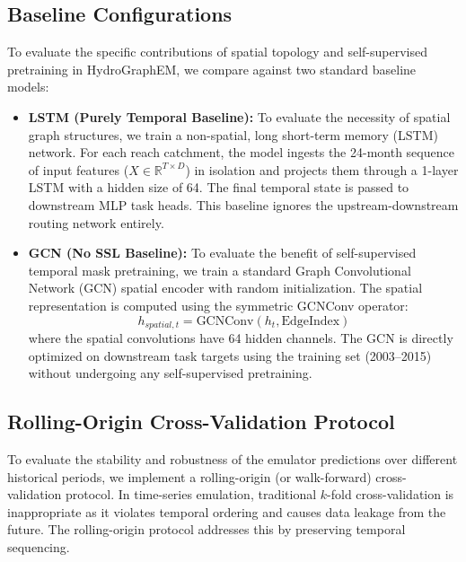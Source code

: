 \documentclass[preprint,12pt]{elsarticle}
\begin{document}
\subsection{Baseline Configurations}
To evaluate the specific contributions of spatial topology and self-supervised pretraining in HydroGraphEM, we compare against two standard baseline models:
\begin{itemize}
    \item \textbf{LSTM (Purely Temporal Baseline):} To evaluate the necessity of spatial graph structures, we train a non-spatial, long short-term memory (LSTM) network. For each reach catchment, the model ingests the 24-month sequence of input features ($X \in \mathbb{R}^{T \times D}$) in isolation and projects them through a 1-layer LSTM with a hidden size of 64. The final temporal state is passed to downstream MLP task heads. This baseline ignores the upstream-downstream routing network entirely.
    \item \textbf{GCN (No SSL Baseline):} To evaluate the benefit of self-supervised temporal mask pretraining, we train a standard Graph Convolutional Network (GCN) spatial encoder with random initialization. The spatial representation is computed using the symmetric GCNConv operator:
    \begin{equation}
        h_{spatial, t} = \text{GCNConv}(h_t, \text{EdgeIndex})
    \end{equation}
    where the spatial convolutions have 64 hidden channels. The GCN is directly optimized on downstream task targets using the training set (2003--2015) without undergoing any self-supervised pretraining.
\end{itemize}

\subsection{Rolling-Origin Cross-Validation Protocol}
To evaluate the stability and robustness of the emulator predictions over different historical periods, we implement a rolling-origin (or walk-forward) cross-validation protocol. In time-series emulation, traditional $k$-fold cross-validation is inappropriate as it violates temporal ordering and causes data leakage from the future. The rolling-origin protocol addresses this by preserving temporal sequencing. 
\end{document}
